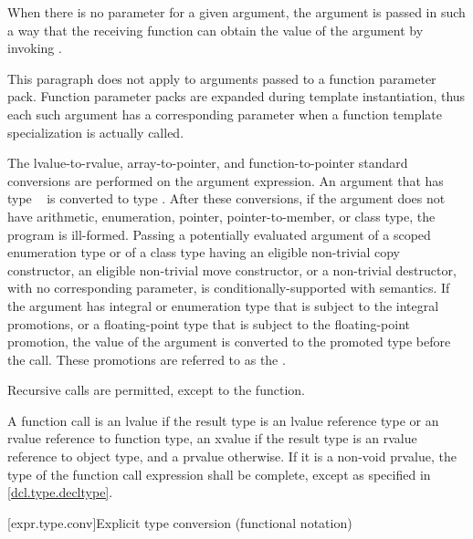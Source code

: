 \pnum
{}%
When there is no parameter for a given argument, the argument is passed
in such a way that the receiving function can obtain the value of the
argument by invoking .
\begin{note}
This paragraph does not apply to arguments passed to a function parameter pack.
Function parameter packs are expanded during template instantiation,
thus each such argument has a corresponding parameter when a function template
specialization is actually called.
\end{note}
The
lvalue-to-rvalue, array-to-pointer,
and function-to-pointer standard conversions are
performed on the argument expression.
An argument that has type \cv{}~ is converted
to type .
After these conversions, if the
argument does not have arithmetic, enumeration, pointer, pointer-to-member,
or class type, the program is ill-formed.
Passing a potentially evaluated argument
of a scoped enumeration type or
of a class type having
an eligible non-trivial copy constructor,
an eligible non-trivial move constructor, or
a non-trivial destructor,
with no corresponding parameter, is conditionally-supported with
 semantics. If the argument has
integral or enumeration type that is subject to the integral
promotions, or a floating-point type that is subject to the
floating-point promotion, the value of the argument is converted to the
promoted type before the call. These promotions are referred to as
the .

\pnum
{}%
Recursive calls are permitted, except to the 
function.

\pnum
A function call is an lvalue
if the result type is an lvalue reference type or an rvalue reference to function type,
an xvalue if the result type is an rvalue reference to object type, and a prvalue
otherwise.
If it is a non-void prvalue,
the type of the function call expression shall be complete,
except as specified in \ref{dcl.type.decltype}.

[expr.type.conv]{Explicit type conversion (functional notation)}

